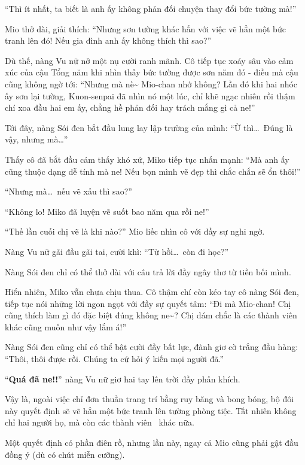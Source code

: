 \documentclass[../main.tex]{subfiles}
\begin{document}
``Thì ít nhất, ta biết là anh ấy không phản đối chuyện thay đổi bức tường mà!''

Mio thở dài, giải thích: ``Nhưng sơn tường khác hẳn với việc vẽ hẳn một bức tranh lên đó! Nếu gia đình anh ấy không thích thì sao?''

Dù thế, nàng Vu nữ nở một nụ cười ranh mãnh. Cô tiếp tục xoáy sâu vào cảm xúc của cậu Tổng năm khi nhìn thấy bức tường được sơn năm đó - điều mà cậu cũng không ngờ tới: ``Nhưng mà nè\~{} Mio-chan nhớ không? Lần đó khi hai nhóc ấy sơn lại tường, Kuon-senpai đã nhìn nó một lúc, chỉ khẽ ngạc nhiên rồi thậm chí xoa đầu hai em ấy, chẳng hề phản đối hay trách mắng gì cả ne!''

Tới đây, nàng Sói đen bắt đầu lung lay lập trường của mình: ``Ừ thì\dots\ Đúng là vậy, nhưng mà\dots''

Thấy cô đã bắt đầu cảm thấy khó xử, Miko tiếp tục nhấn mạnh: ``Mà anh ấy cũng thuộc dạng dễ tính mà ne! Nếu bọn mình vẽ đẹp thì chắc chắn sẽ ổn thôi!''

``Nhưng mà\dots\ nếu vẽ xấu thì sao?''

``Không lo! Miko đã luyện vẽ suốt bao năm qua rồi ne!''

``Thế lần cuối chị vẽ là khi nào?'' Mio liếc nhìn cô với đầy sự nghi ngờ.

Nàng Vu nữ gãi đầu gãi tai, cười khì: ``Từ hồi\dots\ còn đi học?''

Nàng Sói đen chỉ có thể thở dài với câu trả lời đầy ngây thơ từ tiền bối mình.

Hiển nhiên, Miko vẫn chưa chịu thua. Cô thậm chí còn kéo tay cô nàng Sói đen, tiếp tục nói những lời ngon ngọt với đầy sự quyết tâm: ``Đi mà Mio-chan! Chị cũng thích làm gì đó đặc biệt đúng không ne\~{}? Chị dám chắc là các thành viên khác cũng muốn như vậy lắm á!''

Nàng Sói đen cũng chỉ có thể bật cười đầy bất lực, đành giơ cờ trắng đầu hàng: ``Thôi, thôi được rồi. Chúng ta cứ hỏi ý kiến mọi người đã.''

``\textbf{Quá đã ne!!}'' nàng Vu nữ giơ hai tay lên trời đầy phấn khích.

Vậy là, ngoài việc chỉ đơn thuần trang trí bằng ruy băng và bong bóng, bộ đôi này quyết định sẽ vẽ hẳn một bức tranh lên tường phòng tiệc. Tất nhiên không chỉ hai người họ, mà còn các thành viên \hll\ khác nữa.

Một quyết định có phần điên rồ, nhưng lần này, ngay cả Mio cũng phải gật đầu đồng ý (dù có chút miễn cưỡng).

\ct
\end{document}
